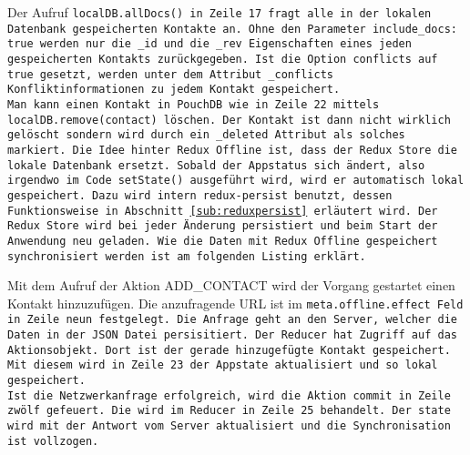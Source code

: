 Der Aufruf \tt{localDB.allDocs()} in Zeile 17 fragt alle in der lokalen Datenbank gespeicherten Kontakte an. Ohne den Parameter \tt{include\_docs: true} werden nur die \tt{\_id} und die \tt{\_rev} Eigenschaften eines jeden gespeicherten Kontakts zurückgegeben. Ist die Option \tt{conflicts} auf \tt{true} gesetzt, werden unter dem Attribut \tt{\_conflicts} Konfliktinformationen zu jedem Kontakt gespeichert.\\
Man kann einen Kontakt in PouchDB wie in Zeile 22 mittels \tt{localDB.remove(contact)} löschen. Der Kontakt ist dann nicht wirklich gelöscht sondern wird durch ein \tt{\_deleted} Attribut als solches markiert.
%
%
Die Idee hinter Redux Offline ist, dass der Redux Store die lokale Datenbank ersetzt. Sobald der Appstatus sich ändert, also irgendwo im Code \tt{setState()} ausgeführt wird, wird er automatisch lokal gespeichert. Dazu wird intern \tt{redux-persist} benutzt, dessen Funktionsweise in Abschnitt \ref{sub:reduxpersist} erläutert wird. Der Redux Store wird bei jeder Änderung persistiert und beim Start der Anwendung neu geladen.
Wie die Daten mit Redux Offline gespeichert synchronisiert werden ist am folgenden Listing erklärt.
\begin{center}  
\end{center}
%
Mit dem Aufruf der Aktion ADD\_CONTACT wird der Vorgang gestartet einen Kontakt hinzuzufügen. Die anzufragende URL ist im \tt{meta.offline.effect} Feld in Zeile neun festgelegt. Die Anfrage geht an den Server, welcher die Daten in der \gls{JSON} Datei persisitiert.
Der Reducer hat Zugriff auf das Aktionsobjekt. Dort ist der gerade hinzugefügte Kontakt gespeichert. Mit diesem wird in Zeile 23 der Appstate aktualisiert und so lokal gespeichert.\\
Ist die Netzwerkanfrage erfolgreich, wird die Aktion \tt{commit} in Zeile zwölf gefeuert. Die wird im Reducer in Zeile 25 behandelt. Der \tt{state} wird mit der Antwort vom Server aktualisiert und die Synchronisation ist vollzogen.\\\\
